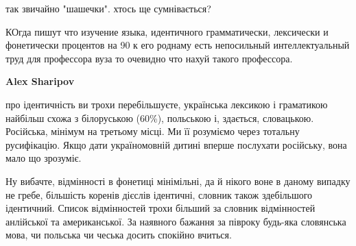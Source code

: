 \begin{itemize}
\begin{itemize}
 
так звичайно "шашечки".
хтось ще сумнівається?
\end{itemize}

 

КОгда пишут что изучение языка, идентичного грамматически, лексически и
фонетически процентов на 90 к его роднаму есть непосильный интеллектуальный
труд для профессора вуза то очевидно что нахуй такого профессора.

\begin{itemize}
 
\textbf{Alex Sharipov} 

про ідентичність ви трохи перебільшуєте, українська лексикою і граматикою
найбільш схожа з білоруською (60\%), польською і, здається, словацькою.
Російська, мінімум на третьому місці. Ми її розуміємо через тотальну
русифікацію. Якщо дати україномовній дитині вперше послухати російську, вона
мало що зрозуміє.


 

Ну вибачте, відмінності в фонетиці мінімільні, да й нікого воне в даному
випадку не гребе, більшість коренів дієслів ідентичні, словник також
здебільшого ідентичний. Список відмінностей трохи більший за словник
відмінностей анлійської та американської. За наявного бажання за півроку
будь-яка словянська мова, чи польська чи чеська досить спокійно вчиться.


 


\end{itemize}
\end{itemize}
